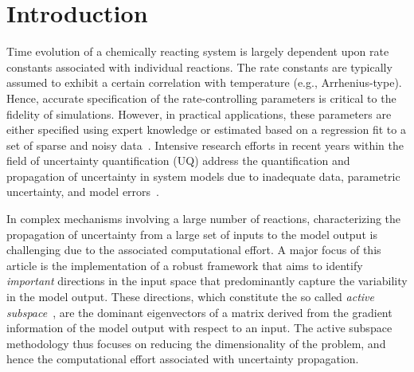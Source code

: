 \section{Introduction}
\label{sec:intro}


Time evolution of a chemically reacting system is largely dependent upon rate
constants associated with individual reactions. The rate constants are
typically assumed to exhibit a certain correlation with temperature (e.g.,
Arrhenius-type). Hence, accurate specification of the rate-controlling
parameters is critical to the fidelity of simulations. However, in practical
applications, these parameters are either specified using expert knowledge or
estimated based on a regression fit to a set of sparse and noisy
data~\cite{Burnham:1987, Burnham:1988, Vohra:2011, Sarathy:2012}.
Intensive research efforts in recent years within the field of uncertainty quantification (UQ)
address the quantification and propagation of uncertainty in system models due to 
inadequate data, parametric uncertainty, and model errors~\cite{Vohra:2014, 
Vohra:2017, Morrison:2018, Hantouche:2018, Nannapaneni:2016, Sankararaman:2015,
Reagana:2003}. 

In complex mechanisms involving a large number of reactions, characterizing the
propagation of uncertainty from a large set of inputs to the model output is
challenging due to the associated computational effort.  A major focus of this
article is the implementation of a robust framework that aims to identify
\emph{important} directions in the input space that predominantly capture the
variability in the model output. These directions, which constitute the so called
\emph{active subspace}~\cite{Constantine:2015}, are the dominant eigenvectors
of a matrix derived from the gradient information of the model output with
respect to an input. The active subspace methodology thus focuses on reducing
the dimensionality of the problem, and hence the computational effort
associated with uncertainty propagation. 

